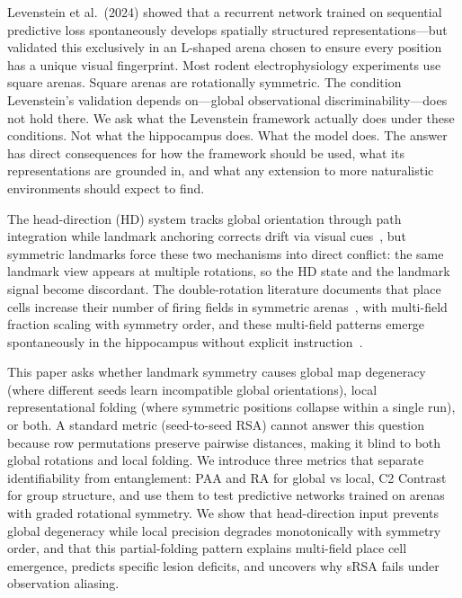 \documentclass[11pt, a4paper]{article}
\begin{document}
Levenstein et al.~(2024) showed that a recurrent network trained on sequential predictive loss spontaneously develops spatially structured representations---but validated this exclusively in an L-shaped arena chosen to ensure every position has a unique visual fingerprint. Most rodent electrophysiology experiments use square arenas. Square arenas are rotationally symmetric. The condition Levenstein's validation depends on---global observational discriminability---does not hold there. We ask what the Levenstein framework actually does under these conditions. Not what the hippocampus does. What the model does. The answer has direct consequences for how the framework should be used, what its representations are grounded in, and what any extension to more naturalistic environments should expect to find.

The head-direction (HD) system tracks global orientation through path integration while landmark anchoring corrects drift via visual cues~\cite{taube1990, knierim1995}, but symmetric landmarks force these two mechanisms into direct conflict: the same landmark view appears at multiple rotations, so the HD state and the landmark signal become discordant. The double-rotation literature documents that place cells increase their number of firing fields in symmetric arenas~\cite{muller1987, knierim1995}, with multi-field fraction scaling with symmetry order, and these multi-field patterns emerge spontaneously in the hippocampus without explicit instruction~\cite{leutgeb2005}.

This paper asks whether landmark symmetry causes global map degeneracy (where different seeds learn incompatible global orientations), local representational folding (where symmetric positions collapse within a single run), or both. A standard metric (seed-to-seed RSA) cannot answer this question because row permutations preserve pairwise distances, making it blind to both global rotations and local folding. We introduce three metrics that separate identifiability from entanglement: PAA and RA for global vs local, C2 Contrast for group structure, and use them to test predictive networks trained on arenas with graded rotational symmetry. We show that head-direction input prevents global degeneracy while local precision degrades monotonically with symmetry order, and that this partial-folding pattern explains multi-field place cell emergence, predicts specific lesion deficits, and uncovers why sRSA fails under observation aliasing.
\end{document}
